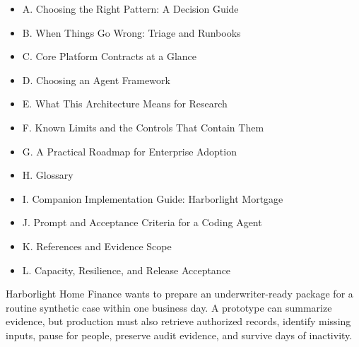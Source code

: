 \begin{itemize}

\item A. Choosing the Right Pattern: A Decision Guide

\item B. When Things Go Wrong: Triage and Runbooks

\item C. Core Platform Contracts at a Glance

\item D. Choosing an Agent Framework

\item E. What This Architecture Means for Research

\item F. Known Limits and the Controls That Contain Them

\item G. A Practical Roadmap for Enterprise Adoption

\item H. Glossary

\item I. Companion Implementation Guide: Harborlight Mortgage

\item J. Prompt and Acceptance Criteria for a Coding Agent

\item K. References and Evidence Scope

\item L. Capacity, Resilience, and Release Acceptance

\end{itemize}

\mainmatter




\begin{bookcallout}
Harborlight Home Finance wants to prepare an underwriter-ready package for a routine synthetic case within one business day. A prototype can summarize evidence, but production must also retrieve authorized records, identify missing inputs, pause for people, preserve audit evidence, and survive days of inactivity.
\end{bookcallout}

